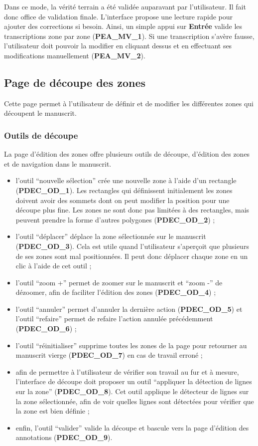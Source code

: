 Dans ce mode, la vérité terrain a été validée auparavant par l’utilisateur.
Il fait donc office de validation finale. L’interface propose une lecture
rapide pour ajouter des corrections si besoin. Ainsi, un simple appui sur
\textbf{Entrée} valide les transcriptions zone par zone (\textbf{PEA\_MV\_1}).
Si une transcription s’avère fausse, l’utilisateur doit pouvoir la modifier
en cliquant dessus et en effectuant ses modifications manuellement
(\textbf{PEA\_MV\_2}).

\subsection{Page de découpe des zones}

Cette page permet à l’utilisateur de définir et de modifier les différentes
zones qui découpent le manuscrit.

\subsubsection{Outils de découpe}

La page d’édition des zones offre plusieurs outils de découpe, d’édition des
zones et de navigation dans le manuscrit.
\begin{itemize}
\item l’outil “nouvelle sélection” crée une nouvelle zone à l’aide d’un
rectangle (\textbf{PDEC\_OD\_1}). Les rectangles qui définissent initialement
les zones doivent avoir des sommets dont on peut modifier la position pour
une découpe plus fine. Les zones ne sont donc pas limitées à des rectangles,
mais peuvent prendre la forme d’autres polygones (\textbf{PDEC\_OD\_2}) ;
\item l’outil “déplacer” déplace la zone sélectionnée sur le manuscrit
(\textbf{PDEC\_OD\_3}). Cela est utile quand l’utilisateur s’aperçoit que
plusieurs de ses zones sont mal positionnées. Il peut donc déplacer chaque
zone en un clic à l’aide de cet outil ;
\item l’outil “zoom +” permet de zoomer sur le manuscrit et “zoom -” de
dézoomer, afin de faciliter l’édition des zones (\textbf{PDEC\_OD\_4}) ;
\item l’outil “annuler” permet d’annuler la dernière action
(\textbf{PDEC\_OD\_5}) et l’outil “refaire” permet de refaire l’action
annulée précédemment (\textbf{PDEC\_OD\_6}) ;
\item l’outil “réinitialiser” supprime toutes les zones de la page pour
retourner au manuscrit vierge (\textbf{PDEC\_OD\_7}) en cas de travail erroné ;
\item afin de permettre à l’utilisateur de vérifier son travail au fur et à
mesure, l’interface de découpe doit proposer un outil “appliquer la détection
de lignes sur la zone” (\textbf{PDEC\_OD\_8}). Cet outil applique le détecteur
de lignes sur la zone sélectionnée, afin de voir quelles lignes sont détectées
pour vérifier que la zone est bien définie ;
\item enfin, l’outil “valider” valide la découpe et bascule vers la page
d’édition des annotations (\textbf{PDEC\_OD\_9}).
\end{itemize}

